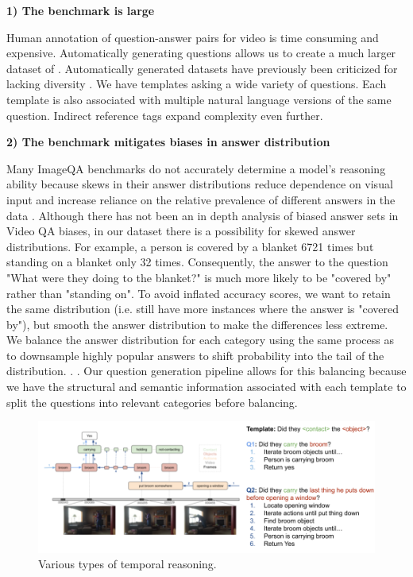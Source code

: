 \documentclass[10pt,twocolumn,letterpaper]{article}
\newcommand{\mgm}[1]{{\color{cyan}{mgm: #1}}}
\begin{document}
    \textbf{1) The benchmark is large} 
    
    Human annotation of question-answer pairs for video is time consuming and expensive. Automatically generating questions allows us to create a much larger dataset of \mgm{add here}. Automatically generated datasets have previously been criticized for lacking diversity \cite{yu2019activitynet}. We have \mgm{add} templates asking a wide variety of questions. Each template is also associated with multiple natural language versions of the same question. Indirect reference tags expand complexity even further.
    
    \mgm{make some sort of graphic comparing size?}

    \textbf{2) The benchmark mitigates biases in answer distribution}
    
    Many ImageQA benchmarks do not accurately determine a model's reasoning ability because skews in their answer distributions reduce dependence on visual input and increase reliance on the relative prevalence of different answers in the data \cite{hudson2019gqa, goyal2017making}. Although there has not been an in depth analysis of biased answer sets in Video QA biases, in our dataset there is a possibility for skewed answer distributions. For example, a person is covered by a blanket 6721 times but standing on a blanket only 32 times. Consequently, the answer to the question "What were they doing to the blanket?" is much more likely to be "covered by" rather than "standing on". To avoid inflated accuracy scores, we want to retain the same distribution (i.e. still have more instances where the answer is "covered by"), but smooth the answer distribution to make the differences less extreme. We balance the answer distribution for each category using the same process as \cite{hudson2019gqa} to downsample highly popular answers to shift probability into the tail of the distribution. \mgm{Talk about the process in detail for doing that? Global vs local variables}. \mgm{Include graphs}. Our question generation pipeline allows for this balancing because we have the structural and semantic information associated with each template to split the questions into relevant categories before balancing. 
    
    \begin{figure}[t]
\begin{center}
\includegraphics[width=0.8\linewidth]{figure_compareQs.png}
\end{center}
   \caption{Various types of temporal reasoning.}
\label{fig:long}
\label{fig:onecol}
\end{figure}
\end{document}

